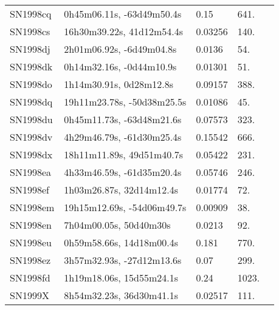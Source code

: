 \begin{longtable}{lllll}
         SN1998cq &      0h45m06.11s, -63d49m50.4s &     0.15 &           641. &    \citet{1998IAUC.6955A...1G} \\
         SN1998cs &      16h30m39.22s, 41d12m54.4s &  0.03256 &           140. &    \citet{1990ApJS...74....1Z} \\
         SN1998dj &       2h01m06.92s, -6d49m04.8s &   0.0136 &            54. &    \citet{1993AJ....105.1637H} \\
         SN1998dk &       0h14m32.16s, -0d44m10.9s &  0.01301 &            51. &    \citet{2016SDSSD.C...0000:} \\
         SN1998do &        1h14m30.91s, 0d28m12.8s &  0.09157 &           388. &    \citet{2003SDSS1.C...0000:} \\
         SN1998dq &     19h11m23.78s, -50d38m25.5s &  0.01086 &            45. &    \citet{1992ApJS...81..413M} \\
         SN1998du &      0h45m11.73s, -63d48m21.6s &  0.07573 &           323. &  \citet{1998AandAS..129..399K} \\
         SN1998dv &      4h29m46.79s, -61d30m25.4s &  0.15542 &           666. &  \citet{2009AandA...495..707C} \\
         SN1998dx &      18h11m11.89s, 49d51m40.7s &  0.05422 &           231. &    \citet{2004AJ....128.1558S} \\
         SN1998ea &      4h33m46.59s, -61d35m20.4s &  0.05746 &           246. &    \citet{2003ApJ...591..764C} \\
         SN1998ef &       1h03m26.87s, 32d14m12.4s &  0.01774 &            72. &    \citet{1999PASP..111..438F} \\
         SN1998em &     19h15m12.69s, -54d06m49.7s &  0.00909 &            38. &    \citet{20096dF...C...0000J} \\
         SN1998en &         7h04m00.05s, 50d40m30s &   0.0213 &            92. &    \citet{1999PASP..111..438F} \\
         SN1998eu &       0h59m58.66s, 14d18m00.4s &    0.181 &           770. &    \citet{1999IAUC.7082B...1G} \\
         SN1998ez &      3h57m32.93s, -27d12m13.6s &     0.07 &           299. &    \citet{1999IAUC.7090C...1F} \\
         SN1998fd &       1h19m18.06s, 15d55m24.1s &     0.24 &          1023. &    \citet{1999IAUC.7091B...1F} \\
          SN1999X &       8h54m32.23s, 36d30m41.1s &  0.02517 &           111. &    \citet{2004ApJ...607..202M} \\

\end{longtable}
